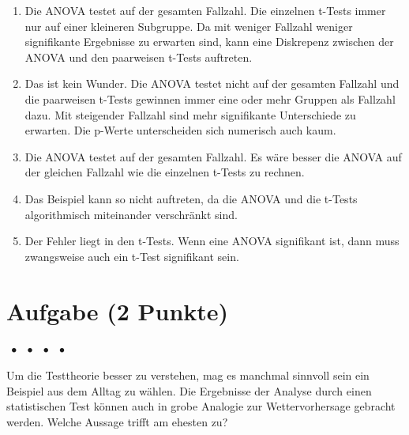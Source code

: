 \documentclass[a4paper, 9pt]{scrartcl}\usepackage[]{graphicx}\usepackage[]{xcolor}
\begin{document}
{\begin{enumerate}
\item [\textbf{A} \msquare] Die ANOVA testet auf der gesamten Fallzahl. Die einzelnen t-Tests immer nur auf einer kleineren Subgruppe. Da mit weniger Fallzahl weniger signifikante Ergebnisse zu erwarten sind, kann eine Diskrepenz zwischen der ANOVA und den paarweisen t-Tests auftreten.
\item [\textbf{B} \msquare] Das ist kein Wunder. Die ANOVA testet nicht auf der gesamten Fallzahl und die paarweisen t-Tests gewinnen immer eine oder mehr Gruppen als Fallzahl dazu. Mit steigender Fallzahl sind mehr signifikante Unterschiede zu erwarten. Die p-Werte unterscheiden sich numerisch auch kaum.
\item [\textbf{C} \msquare] Die ANOVA testet auf der gesamten Fallzahl. Es wäre besser die ANOVA auf der gleichen Fallzahl wie die einzelnen t-Tests zu rechnen.
\item [\textbf{D} \msquare] Das Beispiel kann so nicht auftreten, da die ANOVA und die t-Tests algorithmisch miteinander verschränkt sind.
\item [\textbf{E} \msquare] Der Fehler liegt in den t-Tests. Wenn eine ANOVA signifikant ist, dann muss zwangsweise auch ein t-Test signifikant sein.
\end{enumerate} 

\section{Aufgabe \hfill (2 Punkte)}

\ifcollection
\begin{flushright}
\tiny\vspace{-2Ex}
\textbf{\examinhaltstart}
\exammodulemathstat $\;\bullet$
\exammodulestat $\;\bullet$
\exammodulestatbbv $\;\bullet$
\exammodulestatversuch $\;\bullet$
\exammodulebiostat
\vspace{-1Ex}
\end{flushright}
\fi




Um die Testtheorie besser zu verstehen, mag es manchmal sinnvoll sein ein Beispiel aus dem Alltag zu wählen. Die Ergebnisse der Analyse durch einen statistischen Test können auch in grobe Analogie zur Wettervorhersage gebracht werden. Welche Aussage trifft am ehesten zu?



}
\end{document}
